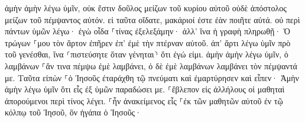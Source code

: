 \documentclass{openreader}
\begin{document}
ἀμὴν ἀμὴν λέγω ὑμῖν, οὐκ ἔστιν δοῦλος μείζων τοῦ κυρίου αὐτοῦ οὐδὲ ἀπόστολος μείζων τοῦ πέμψαντος αὐτόν. 
εἰ ταῦτα οἴδατε, μακάριοί ἐστε ἐὰν ποιῆτε αὐτά. 
οὐ περὶ πάντων ὑμῶν λέγω· ἐγὼ οἶδα ⸀τίνας ἐξελεξάμην· ἀλλ’ ἵνα ἡ γραφὴ πληρωθῇ· Ὁ τρώγων ⸀μου τὸν ἄρτον ἐπῆρεν ἐπ’ ἐμὲ τὴν πτέρναν αὐτοῦ. 
ἀπ’ ἄρτι λέγω ὑμῖν πρὸ τοῦ γενέσθαι, ἵνα ⸂πιστεύσητε ὅταν γένηται⸃ ὅτι ἐγώ εἰμι. 
ἀμὴν ἀμὴν λέγω ὑμῖν, ὁ λαμβάνων ⸀ἄν τινα πέμψω ἐμὲ λαμβάνει, ὁ δὲ ἐμὲ λαμβάνων λαμβάνει τὸν πέμψαντά με. 
Ταῦτα εἰπὼν ⸀ὁ Ἰησοῦς ἐταράχθη τῷ πνεύματι καὶ ἐμαρτύρησεν καὶ εἶπεν· Ἀμὴν ἀμὴν λέγω ὑμῖν ὅτι εἷς ἐξ ὑμῶν παραδώσει με. 
⸀ἔβλεπον εἰς ἀλλήλους οἱ μαθηταὶ ἀπορούμενοι περὶ τίνος λέγει. 
⸀ἦν ἀνακείμενος εἷς ⸀ἐκ τῶν μαθητῶν αὐτοῦ ἐν τῷ κόλπῳ τοῦ Ἰησοῦ, ὃν ἠγάπα ὁ Ἰησοῦς· 
\end{document}
